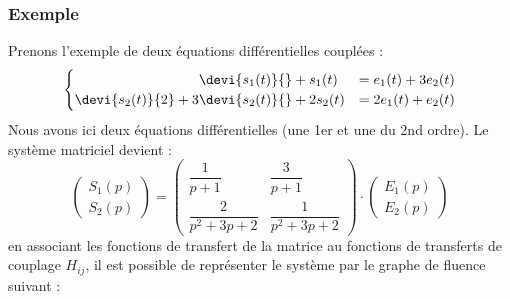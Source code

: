\subsubsection*{Exemple}
Prenons l'exemple de deux équations différentielles couplées :
\[
\begin{cases}
\hphantom{\devi{s_2(t)}{2}+3}\devi{s_1(t)}{}+ s_1(t)  &=  e_1(t) + 3e_2(t) \\
          \devi{s_2(t)}{2}+3 \devi{s_2(t)}{}+ 2s_2(t) &= 2e_1(t) +  e_2(t)
\end{cases}
\]
Nous avons ici deux équations différentielles (une 1er et une du 2nd ordre).
Le système matriciel devient :
\[
    \begin{pmatrix} 
        S_1(p)\\
        S_2(p)
    \end{pmatrix}=
    \begin{pmatrix} 
    \dfrac{1}{p+1}      & \dfrac{3}{p+1} \\[2em] 
    \dfrac{2}{p^2+3p+2} & \dfrac{1}{p^2+3p+2} 
    \end{pmatrix}\cdot
    \begin{pmatrix} 
        E_1(p)\\
        E_2(p)
    \end{pmatrix}
\]
en associant les fonctions de transfert de la matrice au fonctions de transferts
de couplage $H_{ij}$, il est possible de représenter le système par le graphe 
de fluence suivant :
\begin{center}
    
\end{center}
\clearpage
\newcommand{\bdx}{\boldsymbol{x}}
\newcommand{\bds}{\boldsymbol{s}}
\newcommand{\bde}{\boldsymbol{e}}
